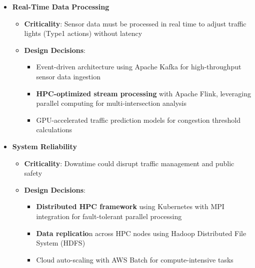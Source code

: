 \documentclass[11.5pt]{article}
\begin{document}
    \begin{itemize}
        \item \textbf{Real-Time Data Processing}
        \begin{itemize}
            \item \textbf{Criticality}: Sensor data must be processed in real time to adjust traffic lights (Type1 actions) without latency
            \item \textbf{Design Decisions}: 
            \begin{itemize}
                \item Event-driven architecture using Apache Kafka for high-throughput sensor data ingestion
                \item \textbf{HPC-optimized stream processing} with Apache Flink, leveraging parallel computing for multi-intersection analysis
                \item GPU-accelerated traffic prediction models for congestion threshold calculations
            \end{itemize}
        \end{itemize}
    
        \item \textbf{System Reliability}
        \begin{itemize}
            \item \textbf{Criticality}: Downtime could disrupt traffic management and public safety
            \item \textbf{Design Decisions}:
            \begin{itemize}
                \item \textbf{Distributed HPC framework} using Kubernetes with MPI integration for fault-tolerant parallel processing
                \item \textbf{Data replicatio}n across HPC nodes using Hadoop Distributed File System (HDFS)
                \item Cloud auto-scaling with AWS Batch for compute-intensive tasks
            \end{itemize}
        \end{itemize}
    

\end{itemize}
\end{document}
